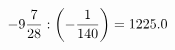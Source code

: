 \documentclass[preview]{standalone}
\begin{document}
\begin{align*}
-9 { 7 \over 28 }  :  \left( - { 1 \over 140 } \right) = 1225.0
\end{align*}
\end{document}
